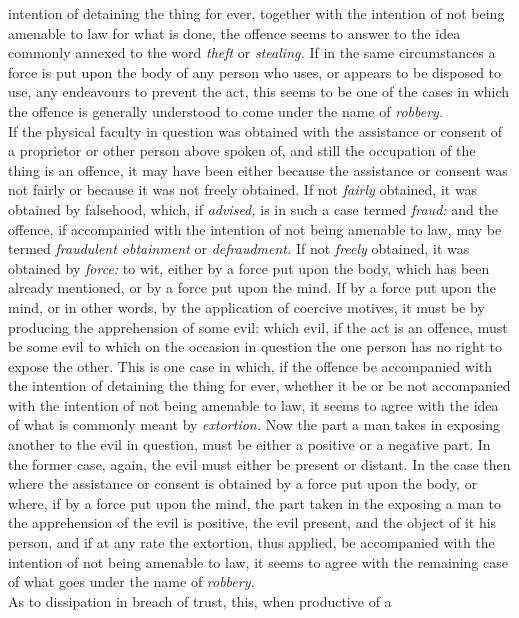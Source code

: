 \documentclass[12pt]{report}
\begin{document}
intention of detaining the thing for ever, together with the intention
of not being amenable to law for what is done, the offence seems to
answer to the idea commonly annexed to the word \emph{theft} or
\emph{stealing.} If in the same circumstances a force is put upon the
body of any person who uses, or appears to be disposed to use, any
endeavours to prevent the act, this seems to be one of the cases in
which the offence is generally understood to come under the name of
\emph{robbery.}\\
If the physical faculty in question was obtained with the assistance or
consent of a proprietor or other person above spoken of, and still the
occupation of the thing is an offence, it may have been either because
the assistance or consent was not fairly or because it was not freely
obtained. If not \emph{fairly} obtained, it was obtained by falsehood,
which, if \emph{advised,} is in such a case termed \emph{fraud:} and the
offence, if accompanied with the intention of not being amenable to law,
may be termed \emph{fraudulent obtainment} or \emph{defraudment.} If not
\emph{freely} obtained, it was obtained by \emph{force:} to wit, either
by a force put upon the body, which has been already mentioned, or by a
force put upon the mind. If by a force put upon the mind, or in other
words, by the application of coercive motives, it must be by producing
the apprehension of some evil: which evil, if the act is an offence,
must be some evil to which on the occasion in question the one person
has no right to expose the other. This is one case in which, if the
offence be accompanied with the intention of detaining the thing for
ever, whether it be or be not accompanied with the intention of not
being amenable to law, it seems to agree with the idea of what is
commonly meant by \emph{extortion.} Now the part a man takes in exposing
another to the evil in question, must be either a positive or a negative
part. In the former case, again, the evil must either be present or
distant. In the case then where the assistance or consent is obtained by
a force put upon the body, or where, if by a force put upon the mind,
the part taken in the exposing a man to the apprehension of the evil is
positive, the evil present, and the object of it his person, and if at
any rate the extortion, thus applied, be accompanied with the intention
of not being amenable to law, it seems to agree with the remaining case
of what goes under the name of \emph{robbery.}\\
As to dissipation in breach of trust, this, when productive of a
\end{document}
